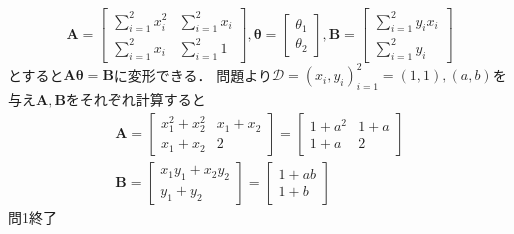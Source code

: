 \documentclass[uplatex,b5j]{jsarticle} %
\begin{document}
\begin{equation} \label{eq:6}
    \boldsymbol{A}=\left[
        \begin{array}{cc}
            \sum_{i=1}^{2}x_{i}^{2} & \sum_{i=1}^{2}x_i \\
            \sum_{i=1}^{2}x_i & \sum_{i=1}^{2}1
        \end{array}
    \right],
    \boldsymbol{\theta}=\left[
        \begin{array}{c}
            \theta_1 \\
            \theta_2
        \end{array}
    \right],
    \boldsymbol{B}=\left[
        \begin{array}{c}
            \sum_{i=1}^{2}y_ix_i  \\
            \sum_{i=1}^{2}y_i
        \end{array}
    \right]
\end{equation}
とすると$\boldsymbol{A\theta}=\boldsymbol{B}$に変形できる．
問題より$\mathcal{D}={(x_i, y_i)_{i=1}^2={(1,1),(a,b)}}$を与え$\boldsymbol{A}, \boldsymbol{B}$をそれぞれ計算すると
\begin{eqnarray}
    \boldsymbol{A}=\left[
        \begin{array}{cc} \label{eq:7}
            x_{1}^{2}+x_{2}^{2} & x_{1}+x_{2} \\
            x_{1}+x_{2} & 2
        \end{array}
    \right]
    = \left[
        \begin{array}{cc}
            1+a^{2} & 1+a \\
            1+a & 2
        \end{array}
    \right]
    \\
    \boldsymbol{B}=\left[
        \begin{array}{c} \label{eq:8}
            x_{1}y_{1}+x_{2}y_{2}  \\
            y_{1}+y_{2}
        \end{array}
    \right]
    = \left[
        \begin{array}{cc}
            1+ab \\
            1+b
        \end{array}
    \right]
\end{eqnarray}
問1終了
\end{document}
